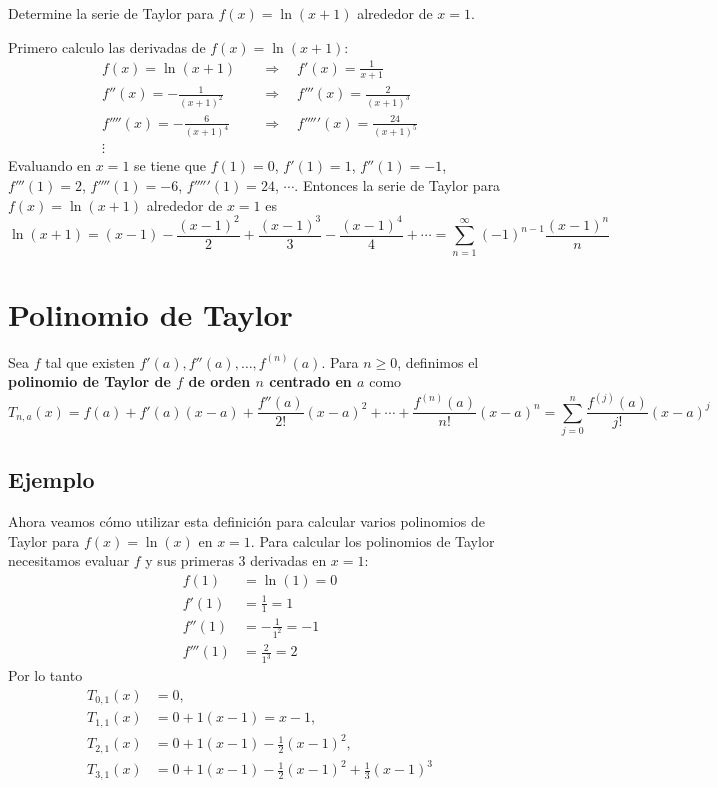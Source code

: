 \documentclass{article}
\begin{document}
\begin{example}{5}
    Determine la serie de Taylor para $f(x) = \ln(x+1)$ alrededor de $x=1$.
\end{example}
Primero calculo las derivadas de $f(x) = \ln(x+1)$:
\begin{align*}
    f(x) = \ln(x+1) \quad &\Rightarrow \quad f'(x) = \frac{1}{x+1} \\
    f''(x) = -\frac{1}{(x+1)^2} \quad &\Rightarrow \quad f'''(x) = \frac{2}{(x+1)^3} \\
    f''''(x) = -\frac{6}{(x+1)^4} \quad &\Rightarrow \quad f'''''(x) = \frac{24}{(x+1)^5} \\
    \vdots
\end{align*}
Evaluando en $x=1$ se tiene que $f(1) = 0$, $f'(1) = 1$, $f''(1) = -1$, $f'''(1) = 2$, $f''''(1) = -6$, $f'''''(1) = 24$, $\cdots$. Entonces la serie de Taylor para $f(x) = \ln(x+1)$ alrededor de $x=1$ es
\begin{equation*}
    \ln(x+1) = (x-1) - \frac{(x-1)^2}{2} + \frac{(x-1)^3}{3} - \frac{(x-1)^4}{4} + \cdots = \sum_{n=1}^{\infty} (-1)^{n-1} \frac{(x-1)^n}{n}
\end{equation*}

\section{Polinomio de Taylor}

Sea $f$ tal que existen $f'(a),f''(a),\dots,f^{(n)}(a)$. Para $n\geq0$, definimos el \textbf{polinomio de Taylor de $f$ de orden $n$ centrado en $a$} como
\begin{equation*}
    T_{n,a}(x) = f(a) + f'(a)(x-a) + \frac{f''(a)}{2!}(x-a)^2 + \cdots + \frac{f^{(n)}(a)}{n!}(x-a)^n = \sum_{j=0}^{n} \frac{f^{(j)}(a)}{j!}(x-a)^j
\end{equation*}

\subsection{Ejemplo}
Ahora veamos cómo utilizar esta definición para calcular varios polinomios de Taylor para $f(x)=\ln(x)$ en $x=1$.
\newline Para calcular los polinomios de Taylor necesitamos evaluar $f$ y sus primeras $3$ derivadas en $x=1$:
\begin{align*}
    f(1) &= \ln(1) = 0 \\
    f'(1) &= \frac{1}{1} = 1 \\
    f''(1) &= -\frac{1}{1^2} = -1 \\
    f'''(1) &= \frac{2}{1^3} = 2
\end{align*}
Por lo tanto
\begin{align*}
    T_{0,1}(x) &= 0, \\
    T_{1,1}(x) &= 0 + 1(x-1) = x-1, \\
    T_{2,1}(x) &= 0 + 1(x-1) - \frac{1}{2}(x-1)^2, \\
    T_{3,1}(x) &= 0 + 1(x-1) - \frac{1}{2}(x-1)^2 + \frac{1}{3}(x-1)^3
\end{align*}
\end{document}
